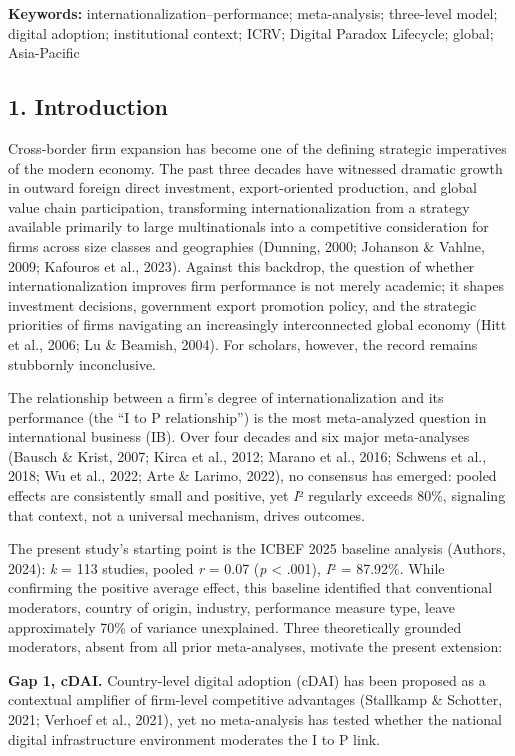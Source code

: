 \documentclass[
  12pt,a4paper]{article}
\begin{document}
\textbf{Keywords:} internationalization--performance; meta-analysis;
three-level model; digital adoption; institutional context; ICRV;
Digital Paradox Lifecycle; global; Asia-Pacific

\hypertarget{introduction}{%
\subsection{1. Introduction}\label{introduction}}

Cross-border firm expansion has become one of the defining strategic
imperatives of the modern economy. The past three decades have witnessed
dramatic growth in outward foreign direct investment, export-oriented
production, and global value chain participation, transforming
internationalization from a strategy available primarily to large
multinationals into a competitive consideration for firms across size
classes and geographies (Dunning, 2000; Johanson \& Vahlne, 2009;
Kafouros et al., 2023). Against this backdrop, the question of whether
internationalization improves firm performance is not merely academic;
it shapes investment decisions, government export promotion policy, and
the strategic priorities of firms navigating an increasingly
interconnected global economy (Hitt et al., 2006; Lu \& Beamish, 2004).
For scholars, however, the record remains stubbornly inconclusive.

The relationship between a firm's degree of internationalization and its
performance (the ``I to P relationship'') is the most meta-analyzed
question in international business (IB). Over four decades and six major
meta-analyses (Bausch \& Krist, 2007; Kirca et al., 2012; Marano et al.,
2016; Schwens et al., 2018; Wu et al., 2022; Arte \& Larimo, 2022), no
consensus has emerged: pooled effects are consistently small and
positive, yet \emph{I}² regularly exceeds 80\%, signaling that context,
not a universal mechanism, drives outcomes.

The present study's starting point is the ICBEF 2025 baseline analysis
(Authors, 2024): \emph{k} = 113 studies, pooled \emph{r} = 0.07
(\emph{p} \textless{} .001), \emph{I}² = 87.92\%. While confirming the
positive average effect, this baseline identified that conventional
moderators, country of origin, industry, performance measure type, leave
approximately 70\% of variance unexplained. Three theoretically grounded
moderators, absent from all prior meta-analyses, motivate the present
extension:

\textbf{Gap 1, cDAI.} Country-level digital adoption (cDAI) has been
proposed as a contextual amplifier of firm-level competitive advantages
(Stallkamp \& Schotter, 2021; Verhoef et al., 2021), yet no
meta-analysis has tested whether the national digital infrastructure
environment moderates the I to P link.
\end{document}
